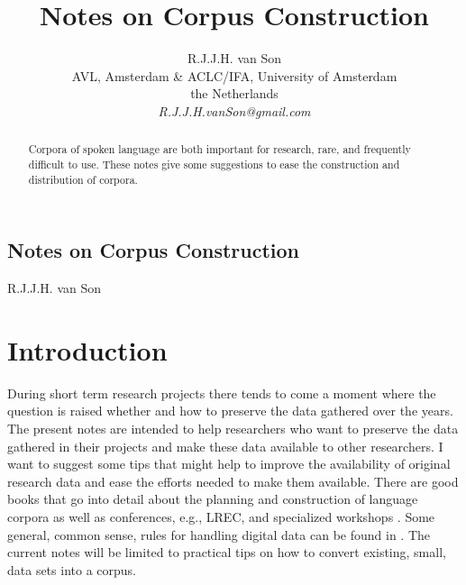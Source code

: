 \documentclass[10pt, a4paper]{article}
\begin{document}
\title{\bf{Notes on Corpus Construction}}

\author{R.J.J.H. van Son \\
AVL, Amsterdam \& ACLC/IFA, University of Amsterdam\\
the Netherlands\\
\emph{R.J.J.H.vanSon@gmail.com}}

\begin{center}
\section*{\bf{Notes on Corpus Construction}}
\large{R.J.J.H. van Son}
\end{center}

\tableofcontents

\maketitle             %

\begin{abstract}
\noindent Corpora of spoken language are both important for research, rare, and frequently difficult to use. These notes give some suggestions to ease the construction and distribution of corpora.
\end{abstract}


\section{Introduction}

During short term research projects there tends to come a moment where the question is raised whether and how to preserve the data gathered over the years. The present notes are intended to help researchers who want to preserve the data gathered in their projects and make these data available to other researchers. I want to suggest some tips that might help to improve the availability of original research data and ease the efforts needed to make them available. There are good books that go into detail about the planning and construction of language corpora \cite{wynne2005developing,gibbon1997handbook,gibbon2000handbook} as well as conferences, e.g., LREC, and specialized workshops \cite{draxler2012using,macwhinney2012best,cieri2012toward,drude2012best}. Some general, common sense, rules for handling digital data can be found in \cite{hart2016ten}. The current notes will be limited to practical tips on how to convert existing, small, data sets into a corpus.
\end{document}
